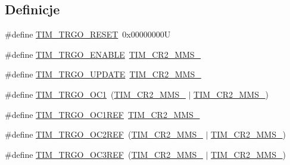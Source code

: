 \subsection*{Definicje}
\begin{DoxyCompactItemize}
\item 
\#define \hyperlink{group___t_i_m___master___mode___selection_ga32a8e436f2c0818a657b0d3fcf4e872d}{T\+I\+M\+\_\+\+T\+R\+G\+O\+\_\+\+R\+E\+S\+ET}~0x00000000U
\item 
\#define \hyperlink{group___t_i_m___master___mode___selection_ga4ac300b0fd24d1e6532e5961680a39a9}{T\+I\+M\+\_\+\+T\+R\+G\+O\+\_\+\+E\+N\+A\+B\+LE}~\hyperlink{group___peripheral___registers___bits___definition_gaf3e55308e84106d6501201e66bd46ab6}{T\+I\+M\+\_\+\+C\+R2\+\_\+\+M\+M\+S\+\_}
\item 
\#define \hyperlink{group___t_i_m___master___mode___selection_ga27521aebd507e562fe7fba6dfc639a67}{T\+I\+M\+\_\+\+T\+R\+G\+O\+\_\+\+U\+P\+D\+A\+TE}~\hyperlink{group___peripheral___registers___bits___definition_ga4b1036929b0a4ba5bd5cced9b8e0f4c3}{T\+I\+M\+\_\+\+C\+R2\+\_\+\+M\+M\+S\+\_}
\item 
\#define \hyperlink{group___t_i_m___master___mode___selection_ga80aa9a9c41de509d99fc4cb492d6513f}{T\+I\+M\+\_\+\+T\+R\+G\+O\+\_\+\+O\+C1}~(\hyperlink{group___peripheral___registers___bits___definition_ga4b1036929b0a4ba5bd5cced9b8e0f4c3}{T\+I\+M\+\_\+\+C\+R2\+\_\+\+M\+M\+S\+\_} $\vert$ \hyperlink{group___peripheral___registers___bits___definition_gaf3e55308e84106d6501201e66bd46ab6}{T\+I\+M\+\_\+\+C\+R2\+\_\+\+M\+M\+S\+\_})
\item 
\#define \hyperlink{group___t_i_m___master___mode___selection_gaed715aa7ec4ad0f7f5d82dde6d964178}{T\+I\+M\+\_\+\+T\+R\+G\+O\+\_\+\+O\+C1\+R\+EF}~\hyperlink{group___peripheral___registers___bits___definition_gacb74a815afdd856d51cfcf1ddf3fce6a}{T\+I\+M\+\_\+\+C\+R2\+\_\+\+M\+M\+S\+\_}
\item 
\#define \hyperlink{group___t_i_m___master___mode___selection_gaaedc4b3f4c5c3c8b45a2cf1b73e33c0a}{T\+I\+M\+\_\+\+T\+R\+G\+O\+\_\+\+O\+C2\+R\+EF}~(\hyperlink{group___peripheral___registers___bits___definition_gacb74a815afdd856d51cfcf1ddf3fce6a}{T\+I\+M\+\_\+\+C\+R2\+\_\+\+M\+M\+S\+\_} $\vert$ \hyperlink{group___peripheral___registers___bits___definition_gaf3e55308e84106d6501201e66bd46ab6}{T\+I\+M\+\_\+\+C\+R2\+\_\+\+M\+M\+S\+\_})
\item 
\#define \hyperlink{group___t_i_m___master___mode___selection_ga4bc4791f8b9560950d30078b96d08f55}{T\+I\+M\+\_\+\+T\+R\+G\+O\+\_\+\+O\+C3\+R\+EF}~(\hyperlink{group___peripheral___registers___bits___definition_gacb74a815afdd856d51cfcf1ddf3fce6a}{T\+I\+M\+\_\+\+C\+R2\+\_\+\+M\+M\+S\+\_} $\vert$ \hyperlink{group___peripheral___registers___bits___definition_ga4b1036929b0a4ba5bd5cced9b8e0f4c3}{T\+I\+M\+\_\+\+C\+R2\+\_\+\+M\+M\+S\+\_})

\end{DoxyCompactItemize}
